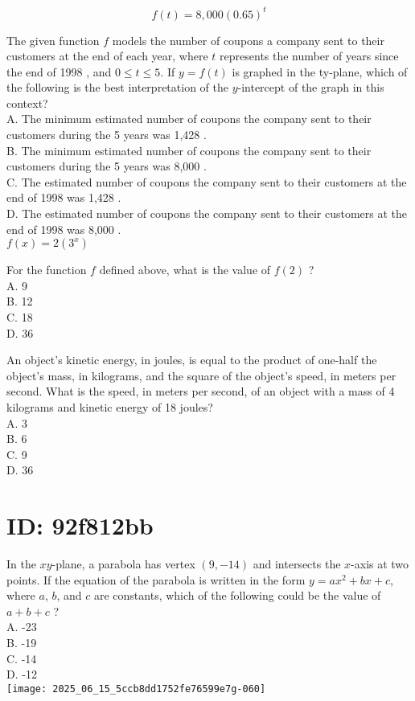 $$
f(t)=8,000(0.65)^{t}
$$

The given function $f$ models the number of coupons a company sent to their customers at the end of each year, where $t$ represents the number of years since the end of 1998 , and $0 \leq t \leq 5$. If $y=f(t)$ is graphed in the ty-plane, which of the following is the best interpretation of the $y$-intercept of the graph in this context?\\
A. The minimum estimated number of coupons the company sent to their customers during the 5 years was 1,428 .\\
B. The minimum estimated number of coupons the company sent to their customers during the 5 years was 8,000 .\\
C. The estimated number of coupons the company sent to their customers at the end of 1998 was 1,428 .\\
D. The estimated number of coupons the company sent to their customers at the end of 1998 was 8,000 .\\
$f(x)=2\left(3^{x}\right)$

For the function $f$ defined above, what is the value of $f(2)$ ?\\
A. 9\\
B. 12\\
C. 18\\
D. 36

An object's kinetic energy, in joules, is equal to the product of one-half the object's mass, in kilograms, and the square of the object's speed, in meters per second. What is the speed, in meters per second, of an object with a mass of 4 kilograms and kinetic energy of 18 joules?\\
A. 3\\
B. 6\\
C. 9\\
D. 36

\section*{ID: 92f812bb}
In the $x y$-plane, a parabola has vertex $(9,-14)$ and intersects the $x$-axis at two points. If the equation of the parabola is written in the form $y=a x^{2}+b x+c$, where $a$, $b$, and $c$ are constants, which of the following could be the value of $a+b+c$ ?\\
A. -23\\
B. -19\\
C. -14\\
D. -12\\
\texttt{[image: 2025\_06\_15\_5ccb8dd1752fe76599e7g-060]}


